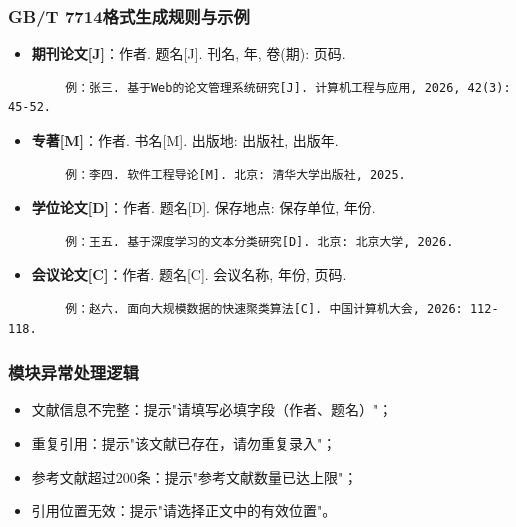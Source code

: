 \documentclass{../template/softeng}
\begin{document}
	\subsubsection{GB/T 7714格式生成规则与示例}
	\begin{itemize}
		\item \textbf{期刊论文[J]}：作者. 题名[J]. 刊名, 年, 卷(期): 页码.
	\end{itemize}
	\begin{verbatim}
		例：张三. 基于Web的论文管理系统研究[J]. 计算机工程与应用, 2026, 42(3): 45-52.
	\end{verbatim}
	\begin{itemize}
		\item \textbf{专著[M]}：作者. 书名[M]. 出版地: 出版社, 出版年.
	\end{itemize}
	\begin{verbatim}
		例：李四. 软件工程导论[M]. 北京: 清华大学出版社, 2025.
	\end{verbatim}
	\begin{itemize}
		\item \textbf{学位论文[D]}：作者. 题名[D]. 保存地点: 保存单位, 年份.
	\end{itemize}
	\begin{verbatim}
		例：王五. 基于深度学习的文本分类研究[D]. 北京: 北京大学, 2026.
	\end{verbatim}
	\begin{itemize}
		\item \textbf{会议论文[C]}：作者. 题名[C]. 会议名称, 年份, 页码.
	\end{itemize}
	\begin{verbatim}
		例：赵六. 面向大规模数据的快速聚类算法[C]. 中国计算机大会, 2026: 112-118.
	\end{verbatim}

	\subsubsection{模块异常处理逻辑}
	\begin{itemize}
		\item 文献信息不完整：提示"请填写必填字段（作者、题名）"；
		\item 重复引用：提示"该文献已存在，请勿重复录入"；
		\item 参考文献超过200条：提示"参考文献数量已达上限"；
		\item 引用位置无效：提示"请选择正文中的有效位置"。
	\end{itemize}

\end{document}
